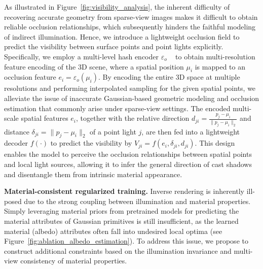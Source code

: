 As illustrated in Figure~\ref{fig:visibility_analysis}, the inherent difficulty of recovering accurate geometry from sparse-view images makes it difficult to obtain reliable occlusion relationships, which subsequently hinders the faithful modeling of indirect illumination. Hence, we introduce a lightweight occlusion field to predict the visibility between surface points and point lights explicitly. Specifically, we employ a multi-level hash encoder $\varepsilon_o$ ~\cite{muller2022instant} to obtain multi-resolution feature encoding of the 3D scene, where a spatial position $\mu_i$ is mapped to an occlusion feature $e_i=\varepsilon_o(\mu_i)$. By encoding the entire 3D space at multiple resolutions and performing interpolated sampling for the given spatial points, we alleviate the issue of inaccurate Gaussian-based geometric modeling and occlusion estimation that commonly arise under sparse-view settings. The encoded multi-scale spatial features $e_i$, together with the relative direction $d_{ji} = \frac{p_j -\mu_i}{\|p_j - \mu_i\|_2}$ and distance $\delta_{ji} = \|p_j-\mu_i\|_2$ of a point light $j$, are then fed into a lightweight decoder $f(\cdot)$ to predict the visibility by $V_{ji} = f(e_i,\delta_{ji},d_{ji})$. This design enables the model to perceive the occlusion relationships between spatial points and local light sources, allowing it to infer the general direction of cast shadows and disentangle them from intrinsic material appearance.


\vspace{0.5em}
\noindent\textbf{Material-consistent regularized training.}
Inverse rendering is inherently ill-posed due to the strong coupling between illumination and material properties. Simply leveraging material priors from pretrained models for predicting the material attributes of Gaussian primitives is still insufficient, as the learned material (albedo) attributes often fall into undesired local optima (see Figure~\ref{fig:ablation_albedo_estimation}). To address this issue, we propose to construct additional constraints based on the illumination invariance and multi-view consistency of material properties. 



